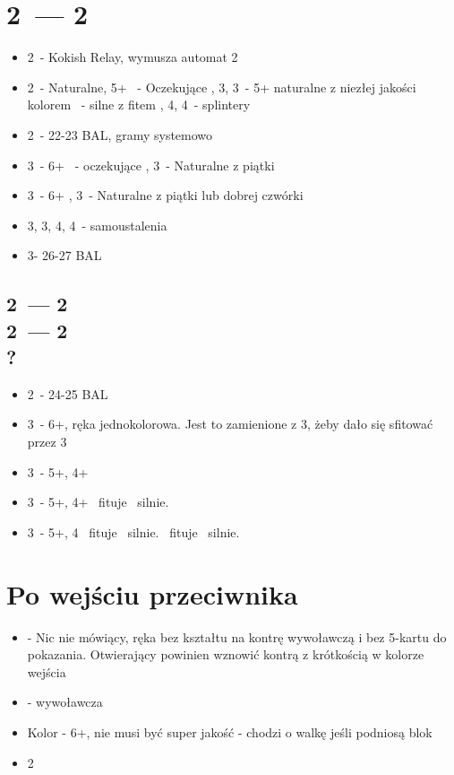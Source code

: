 \documentclass[12pt, a4paper]{article}
\begin{document}
    \pagebreak
    \section{2\clubs\ --- 2\diams}
    \begin{itemize}
        \item 2\hearts\ - Kokish Relay, wymusza automat 2\spades 
        \item 2\spades\ - Naturalne, 5+\spades 
        \nt\ - Oczekujące
        \clubs, 3\diams, 3\hearts\ - 5+ naturalne z niezłej jakości kolorem
        \spades\ - silne z fitem
        \clubs, 4\diams, 4\hearts\ - splintery
        \item 2\nt\ - 22-23 BAL, gramy systemowo
        \item 3\clubs\ - 6+\clubs 
        \diams\ - oczekujące
        \hearts, 3\spades\ - Naturalne z piątki
        \item 3\diams\ - 6+\diams
        \hearts, 3\spades\ - Naturalne z piątki lub dobrej czwórki
        \item 3\hearts, 3\spades, 4\clubs, 4\diams\ - samoustalenia
        \item 3\nt - 26-27 BAL
    \end{itemize}

    \subsection{2\clubs\ --- 2\diams \\ 2\hearts\ --- 2\spades \\ ?}
    \begin{itemize}
        \item 2\nt\ - 24-25 BAL
        \item 3\clubs\ - 6+\hearts, ręka jednokolorowa. Jest to zamienione z 3\hearts, żeby dało się sfitować przez 3\hearts
        \item 3\diams\ - 5+\hearts, 4+\diams
        \item 3\hearts\ - 5+\hearts, 4+\clubs 
        \diams\ fituje \hearts\ silnie.
        \item 3\spades\ - 5+\hearts, 4\spades
        \clubs\ fituje \hearts\ silnie. 
        \diams\ fituje \spades\ silnie. 
    \end{itemize}

    \pagebreak
    \section{Po wejściu przeciwnika}
    \begin{itemize}
        \item \pass - Nic nie mówiący, ręka bez kształtu na kontrę wywoławczą
        i bez 5-kartu do pokazania. Otwierający powinien wznowić kontrą z krótkością w kolorze wejścia
        \item \dbl - wywoławcza
        \item Kolor - 6+\hcp, nie musi być super jakość - chodzi o walkę jeśli podniosą blok 
        \item 2\nt
    \end{itemize}
\end{document}

